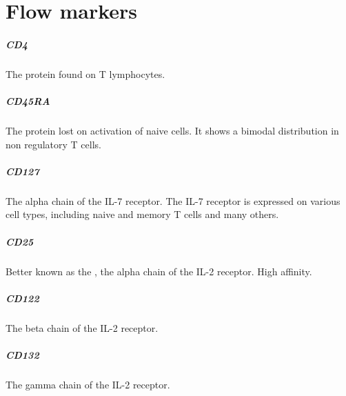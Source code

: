 \chapter{\label{appendix:flowsorting}{Flow markers}}

\paragraph{CD4}
The protein found on T lymphocytes.

\paragraph{CD45RA}
The protein lost on activation of naive cells.
It shows a bimodal distribution in non regulatory T cells.

\paragraph{CD127}
The alpha chain of the IL-7 receptor.
The IL-7 receptor is expressed on various cell types, including naive and memory T cells and many others.

\paragraph{CD25}
Better known as the , the alpha chain of the IL-2 receptor.
High affinity.

\paragraph{CD122}
The beta chain of the IL-2 receptor.

\paragraph{CD132}
The gamma chain of the IL-2 receptor.

